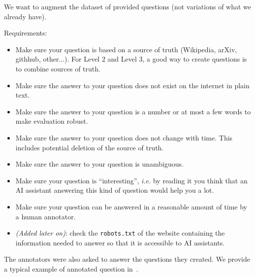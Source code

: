 \documentclass{fairmeta}
\begin{document}
We want to augment the dataset of provided questions (not variations of what we already have).

Requirements:

\begin{itemize}
    \item Make sure your question is based on a source of truth (Wikipedia, arXiv, githhub, other...). For Level 2 and Level 3, a good way to create questions is to combine sources of truth. 
    \item Make sure the answer to your question does not exist on the internet in plain text.
    \item Make sure the answer to your question is a number or at most a few words to make evaluation robust.
    \item Make sure the answer to your question does not change with time. This includes potential deletion of the source of truth.
    \item Make sure the answer to your question is unambiguous.
    \item Make sure your question is ``interesting'', \textit{i.e.} by reading it you think that an AI assistant answering this kind of question would help you a lot.
    \item Make sure your question can be answered in a reasonable amount of time by a human annotator.
    \item \textit{(Added later on)}: check the \texttt{robots.txt} of the website containing the information needed to answer so that it is accessible to AI assistants.
\end{itemize}

The annotators were also asked to answer the questions they created. We provide a typical example of annotated question in~.
\end{document}
